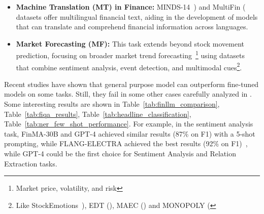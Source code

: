 \begin{itemize}
	\item \textbf{Machine Translation (MT) in Finance:} MINDS-14~\cite{gerz2021multilingual}) and MultiFin (\textcite{jorgensen2023multifin} datasets offer multilingual financial text, aiding in the development of models that can translate and comprehend financial information across languages.
	\item \textbf{Market Forecasting (MF):} This task extends beyond stock movement prediction, focusing on broader market trend forecasting~\footnote{Market price, volatility, and risk} using datasets that combine sentiment analysis, event detection, and multimodal cues\footnote{Like StockEmotions~\cite{lee2023stockemotions}), EDT (\textcite{zhou2021trade}), MAEC (\textcite{li2020maec}) and MONOPOLY (\textcite{mathur2022monopoly}}.
\end{itemize}

Recent studies have shown that general purpose model can outperform fine-tuned models on some tasks.
Still, they fail in some other cases carefully analyzed in \textcite{li2023chatgpt}.
Some interesting results are shown in Table~\ref{tab:finllm_comparison}, Table~\ref{tab:fiqa_results}, Table~\ref{tab:headline_classification}, Table~\ref{tab:ner_few_shot_performance}.
For example, in the sentiment analysis task, FinMA-30B and GPT-4 achieved similar results (87\% on F1) with a 5-shot prompting, while FLANG-ELECTRA achieved the best results (92\% on F1)~\textcite{lee2024survey}, while GPT-4 could be the first choice for Sentiment Analysis and Relation Extraction tasks.

